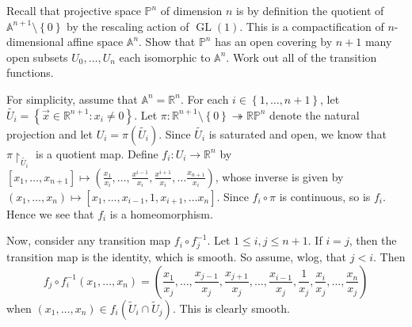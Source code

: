 \documentclass[10pt,letterpaper,cm]{nupset}
\theoremstyle{definition}
\theoremstyle{theorem}
\theoremstyle{remark}
\renewcommand{\P}{\mathbb P}
\newcommand{\R}{\mathbb{R}}
\newcommand{\RP}{\mathbb{RP}}
\newcommand{\1}{\mathbb{1}}
\newcommand{\x}{\vec x}
\newcommand{\0}{\vec 0}
\DeclareMathOperator{\GL}{GL}
\begin{document}
\begin{problem}

Recall that projective space $\P^n$ of dimension $n$ is by definition the	quotient	of $\mathbb{A}^{n+1}\setminus \left\{0\right\}$		by	the	rescaling	action	of	$\GL(1)$.	This 	is a compactification	of	$n$-dimensional affine	space	$\mathbb{A}^n$.
Show	that	$\P^n$	has	an	open	covering	by	$n+1$ many	open	subsets	$U_0,\ldots,U_n$	each	isomorphic	to $\mathbb{A}^n$.	Work	 out	all of the	transition	functions.
\end{problem}
\begin{solution}
For simplicity, assume that $\mathbb{A}^n = \mathbb{R}^n$.  For each $i \in \left\{ 1, \ldots, n+1\right\}$, let $\widetilde{U_i}= \left\{\x \in \R^{n+1} : x_i \ne 0\right\}$. Let $\pi: \R^{n+1} \setminus \left\{0\right\} \twoheadrightarrow \RP^n$ denote the natural projection and let $U_i = \pi\left(\widetilde{U_i}\right)$. Since $\widetilde{U_i}$ is saturated and open, we know that $\pi \restriction_{\widetilde{U_i}}$ is a quotient map. Define $f_i : U_i \to \R^n$ by $\left[x_1, \ldots, x_{n+1}\right] \mapsto \left(\frac{x_1}{x_i}, \ldots, \frac{x^{i-1}}{x_i}, \frac{x^{i+1}}{x_i}, \ldots \frac{x_{n+1}}{x_i}\right)$, whose inverse is given by  $\left(x_1, \ldots, x_n\right) \mapsto \left[x_1, \ldots, x_{i-1}, 1, x_{i+1}, \ldots x_n\right]$. Since $f_i \circ \pi$ is continuous, so is $f_i$. Hence we see that $f_i$ is a homeomorphism. 

\smallskip

Now, consider any transition map $f_i \circ f_j^{-1}$. 
Let $1\leq i,j\leq n+1$. If $i=j$, then the transition map is the identity, which is smooth. So assume, wlog, that $j< i$.  Then $$f_j \circ f_i^{-1}(x_1, \ldots, x_n) = \left(\frac{x_1}{x_{j}}, \ldots, \frac{x_{j-1}}{x_{j}}, \frac{x_{j+1}}{x_{j}}, \ldots, \frac{x_{i-1}}{x_{j}}, \frac{1}{x_j}, \frac{x_{i}}{x_{j}}, \ldots, \frac{x_{n}}{x_{j}}\right)$$ when $\left(x_1, \ldots, x_n\right) \in f_i\left(\widetilde{U}_i \cap \widetilde{U}_j\right)$. This is clearly smooth. 
\end{solution}
\end{document}
